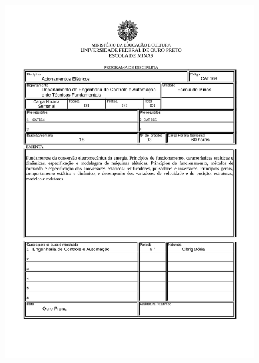 \begin{figure}[p]
	\centering 
	\includegraphics[scale=0.7]{capitulos/anexo1-programas-disciplina/p62.pdf}
\end{figure}

